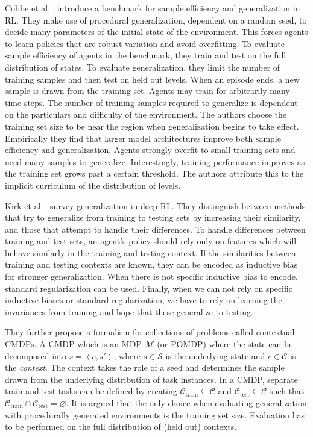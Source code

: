 Cobbe et al.~\cite{cobbe_procgen_2020} introduce a benchmark for sample efficiency and generalization in RL.
They make use of procedural generalization, dependent on a random seed, to decide many parameters of the initial state of the environment.
This forces agents to learn policies that are robust variation and avoid overfitting.
To evaluate sample efficiency of agents in the benchmark, they train and test on the full distribution of states.
To evaluate generalization, they limit the number of training samples and then test on held out levels.
When an episode ends, a new sample is drawn from the training set.
Agents may train for arbitrarily many time steps.
The number of training samples required to generalize is dependent on the particulars and difficulty of the environment.
The authors choose the training set size to be near the region when generalization begins to take effect.
Empirically they find that larger model architectures improve both sample efficiency and generalization.
Agents strongly overfit to small training sets and need many samples to generalize.
Interestingly, training performance improves as the training set grows past a certain threshold.
The authors attribute this to the implicit curriculum of the distribution of levels.

Kirk et al.~\cite{kirk_survey_2022} survey generalization in deep RL.
They distinguish between methods that try to generalize from training to testing sets by increasing their similarity, and those that attempt to handle their differences.
To handle differences between training and test sets, an agent's policy should rely only on features which will behave similarly in the training and testing context.
If the similarities between training and testing contexts are known, they can be encoded as inductive bias for stronger generalization.
When there is not specific inductive bias to encode, standard regularization can be used.
Finally, when we can not rely on specific inductive biases or standard regularization, we have to rely on learning the invariances from training and hope that these generalize to testing.

They further propose a formalism for collections of problems called contextual CMDPs.
A CMDP which is an MDP \(\mathcal{M}\) (or POMDP) where the state can be decomposed into \(s = \left\langle c, s' \right\rangle\),
where \(s \in \mathcal{S}\) is the underlying state and \(c \in \mathcal{C}\) is the \textit{context}.
The context takes the role of a seed and determines the sample drawn from the underlying distribution of task instances.
In a CMDP, separate train and test tasks can be defined by creating \(\mathcal{C}_\text{train} \subseteq \mathcal{C}\) and \(\mathcal{C}_\text{test} \subseteq \mathcal{C}\) such that \(\mathcal{C}_\text{train} \cap \mathcal{C}_\text{test} = \varnothing\).
It is argued that the only choice when evaluating generalization with procedurally generated environments is the training set size.
Evaluation has to be performed on the full distribution of (held out) contexts.

